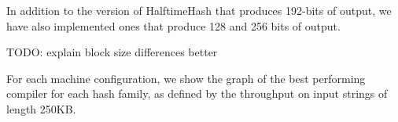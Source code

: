 \documentclass[sigconf, nonacm]{acmart}
\begin{document}




In addition to the version of HalftimeHash that produces 192-bits of output, we have also implemented ones that produce 128 and 256 bits of output.

TODO: explain block size differences better


For each machine configuration, we show the graph of the best performing compiler for each hash family, as defined by the throughput on input strings of length 250KB.

\end{document}
